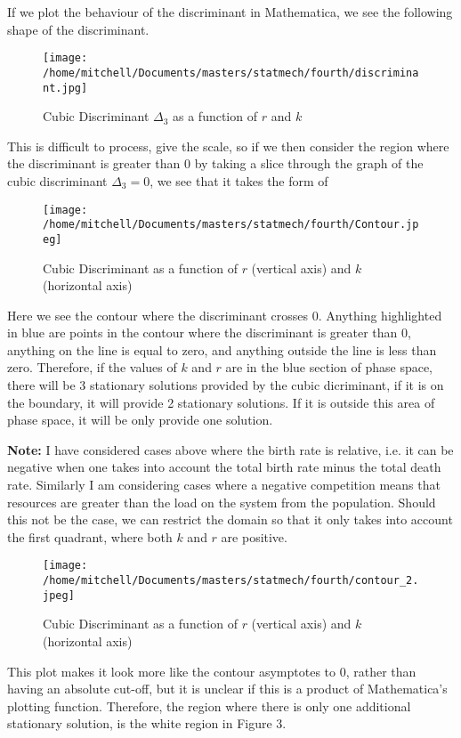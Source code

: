 \documentclass[11pt,a4paper]{article}
\begin{document}
If we plot the behaviour of the discriminant in Mathematica, we see the following shape of the discriminant.
\begin{figure}[H]
\begin{center}
\texttt{[image: /home/mitchell/Documents/masters/statmech/fourth/discriminant.jpg]}
\caption{Cubic Discriminant $\Delta_3 $ as a function of $r$ and $k$}
\end{center}
\end{figure}
This is difficult to process, give the scale, so if we then consider the region where the discriminant is greater than 0 by taking a slice through the graph of the cubic discriminant $\Delta_3 = 0$, we see that it takes the form of 
\begin{figure}[H]
\begin{center}
\texttt{[image: /home/mitchell/Documents/masters/statmech/fourth/Contour.jpeg]}
\caption{Cubic Discriminant as a function of $r$ (vertical axis) and $k$ (horizontal axis)}
\end{center}
\end{figure}
Here we see the contour where the discriminant crosses 0. Anything highlighted in blue are points in the contour where the discriminant is greater than 0, anything on the line is equal to zero, and anything outside the line is less than zero. Therefore, if the values of $k$ and $r$ are in the blue section of phase space, there will be 3 stationary solutions provided by the cubic dicriminant, if it is on the boundary, it will provide 2 stationary solutions. If it is outside this area of phase space, it will be only provide one solution.

\textbf{Note:} I have considered cases above where the birth rate is relative, i.e. it can be negative when one takes into account the total birth rate minus the total death rate. Similarly I am considering cases where a negative competition means that resources are greater than the load on the system from the population. Should this not be the case, we can restrict the domain so that it only takes into account the first quadrant, where both $k$ and $r$ are positive. 
\begin{figure}[H]
\begin{center}
\texttt{[image: /home/mitchell/Documents/masters/statmech/fourth/contour\_2.jpeg]}
\caption{Cubic Discriminant as a function of $r$ (vertical axis) and $k$ (horizontal axis)}
\end{center}
\end{figure}
This plot makes it look more like the contour asymptotes to 0, rather than having an absolute cut-off, but it is unclear if this is a product of Mathematica's plotting function. Therefore, the region where there is only one additional stationary solution, is the white region in Figure 3.
\end{document}
